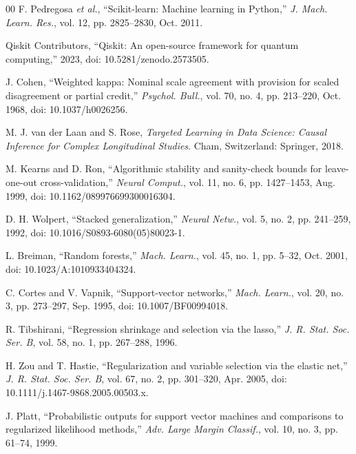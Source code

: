 \documentclass[conference]{IEEEtran}
\begin{document}
{\begin{thebibliography}{00}
F. Pedregosa \emph{et al.}, ``Scikit-learn: Machine learning in Python,'' \emph{J. Mach. Learn. Res.}, vol. 12, pp. 2825--2830, Oct. 2011.

Qiskit Contributors, ``Qiskit: An open-source framework for quantum computing,'' 2023, doi: 10.5281/zenodo.2573505.

J. Cohen, ``Weighted kappa: Nominal scale agreement with provision for scaled disagreement or partial credit,'' \emph{Psychol. Bull.}, vol. 70, no. 4, pp. 213--220, Oct. 1968, doi: 10.1037/h0026256.

M. J. van der Laan and S. Rose, \emph{Targeted Learning in Data Science: Causal Inference for Complex Longitudinal Studies}. Cham, Switzerland: Springer, 2018.

M. Kearns and D. Ron, ``Algorithmic stability and sanity-check bounds for leave-one-out cross-validation,'' \emph{Neural Comput.}, vol. 11, no. 6, pp. 1427--1453, Aug. 1999, doi: 10.1162/089976699300016304.

D. H. Wolpert, ``Stacked generalization,'' \emph{Neural Netw.}, vol. 5, no. 2, pp. 241--259, 1992, doi: 10.1016/S0893-6080(05)80023-1.

L. Breiman, ``Random forests,'' \emph{Mach. Learn.}, vol. 45, no. 1, pp. 5--32, Oct. 2001, doi: 10.1023/A:1010933404324.

C. Cortes and V. Vapnik, ``Support-vector networks,'' \emph{Mach. Learn.}, vol. 20, no. 3, pp. 273--297, Sep. 1995, doi: 10.1007/BF00994018.

R. Tibshirani, ``Regression shrinkage and selection via the lasso,'' \emph{J. R. Stat. Soc. Ser. B}, vol. 58, no. 1, pp. 267--288, 1996.

H. Zou and T. Hastie, ``Regularization and variable selection via the elastic net,'' \emph{J. R. Stat. Soc. Ser. B}, vol. 67, no. 2, pp. 301--320, Apr. 2005, doi: 10.1111/j.1467-9868.2005.00503.x.

J. Platt, ``Probabilistic outputs for support vector machines and comparisons to regularized likelihood methods,'' \emph{Adv. Large Margin Classif.}, vol. 10, no. 3, pp. 61--74, 1999.

\end{thebibliography}
}
\end{document}
